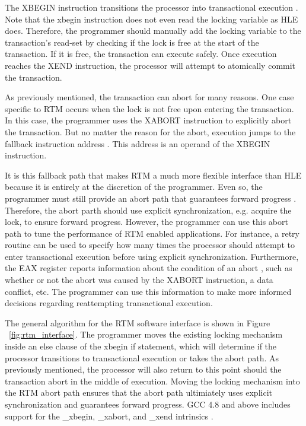 \documentclass[a4paper]{article}
\begin{document}
\indent 
The XBEGIN instruction transitions the processor into transactional
execution \cite{intel_prog_ref}.  Note that the xbegin instruction does not even
read the locking variable as HLE does.  Therefore, the programmer should
manually add the locking variable to the transaction's read-set by checking if
the lock is free at the start of the transaction.  If it is free, the
transaction can execute safely.  Once execution reaches the XEND instruction,
the processor will attempt to atomically commit the transaction.
\par

\indent
As previously mentioned, the transaction can abort for many reasons.
One case specific to RTM occurs when the lock is not free upon entering the
transaction.  In this case, the programmer uses the XABORT instruction to
explicitly abort the transaction.  But no matter the reason for the abort,
execution jumps to the fallback instruction address \cite{intel_prog_ref}.  This
address is an operand of the XBEGIN instruction.
\par

\indent
It is this fallback path that makes RTM a much more flexible interface
than HLE because it is entirely at the discretion of the programmer.  Even so,
the programmer must still provide an abort path that guarantees forward progress
\cite{intel_prog_ref}.  Therefore, the abort parth should use explicit
synchronization, e.g. acquire the lock, to ensure forward progress. However, the
programmer can use this abort path to tune the performance of RTM enabled
applications.  For instance, a retry routine can be used to specify how many
times the processor should attempt to enter transactional execution before using
explicit synchronization.  Furthermore, the EAX register reports information
about the condition of an abort \cite{intel_prog_ref}, such as whether or not
the abort was caused by the XABORT instruction, a data conflict, etc.  The
programmer can use this information to make more informed decisions regarding
reattempting transactional execution.
\par

\indent 
The general algorithm for the RTM software interface is shown in Figure
~\ref{fig:rtm_interface}.  The programmer moves the existing locking mechanism
inside an else clause of the xbegin if statement, which will determine if the
processor transitions to transactional execution or takes the abort path.  As
previously mentioned, the processor will also return to this point should the
transaction abort in the middle of execution. Moving the locking mechanism into
the RTM abort path ensures that the abort path ultimiately uses explicit
synchronization and guarantees forward progress.  GCC 4.8 and above includes
support for the \_xbegin, \_xabort, and \_xend intrinsics \cite{gcc}.
\end{document}
